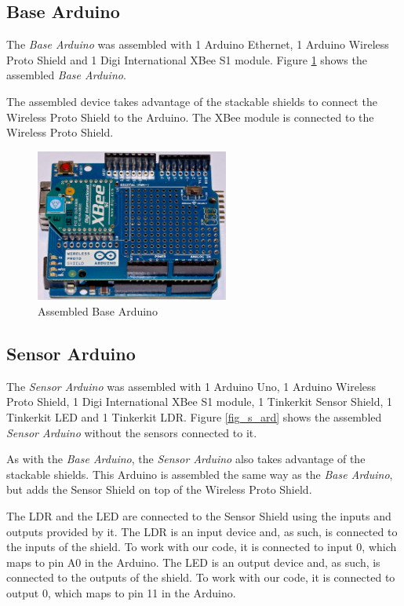 \documentclass[conference, a4paper]{IEEEtran}
\begin{document}
\subsection{Base Arduino}

The \textit{Base Arduino} was assembled with 1 Arduino Ethernet, 1 Arduino Wireless Proto Shield and 1 Digi International XBee S1 module. Figure \ref{fig_b_ard} shows the assembled \textit{Base Arduino}.

The assembled device takes advantage of the stackable shields to connect the Wireless Proto Shield to the Arduino. The XBee module is connected to the Wireless Proto Shield.

\begin{figure}[H]
\centering
\includegraphics[width=2.5in]{Server_Arduino}
\caption{Assembled Base Arduino}
\label{fig_b_ard}
\end{figure}

\subsection{Sensor Arduino}

The \textit{Sensor Arduino} was assembled with 1 Arduino Uno, 1 Arduino Wireless Proto Shield, 1 Digi International XBee S1 module, 1 Tinkerkit Sensor Shield, 1 Tinkerkit LED and 1 Tinkerkit LDR. Figure \ref{fig_s_ard} shows the assembled \textit{Sensor Arduino} without the sensors connected to it.

As with the \textit{Base Arduino}, the \textit{Sensor Arduino} also takes advantage of the stackable shields. This Arduino is assembled the same way as the \textit{Base Arduino}, but adds the Sensor Shield on top of the Wireless Proto Shield.

The LDR and the LED are connected to the Sensor Shield using the inputs and outputs provided by it. The LDR is an input device and, as such, is connected to the inputs of the shield. To work with our code, it is connected to input 0, which maps to pin A0 in the Arduino. The LED is an output device and, as such, is connected to the outputs of the shield. To work with our code, it is connected to output 0, which maps to pin 11 in the Arduino.
\end{document}
